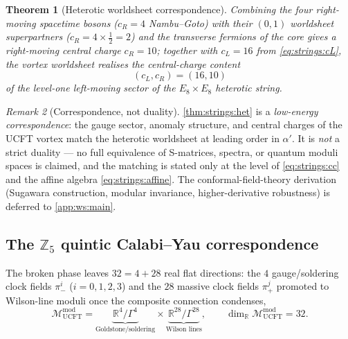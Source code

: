 \documentclass[11pt]{article}
\theoremstyle{plain}
\newtheorem{theorem}{Theorem}[section]
\theoremstyle{definition}
\theoremstyle{remark}
\newtheorem{remark}[theorem]{Remark}
\begin{document}
\begin{theorem}[Heterotic worldsheet correspondence]
\label{thm:strings:het}
Combining the four right-moving spacetime bosons ($c_{R}=4$ Nambu--Goto)
with their $(0,1)$ worldsheet superpartners ($c_{R}=4\times\tfrac12=2$)
and the transverse fermions of the core gives a right-moving central
charge $c_{R}=10$; together with $c_{L}=16$ from \eqref{eq:strings:cL},
the vortex worldsheet realises the central-charge content
\begin{equation}
  (c_{L},c_{R})=(16,10)
  \label{eq:strings:cc}
\end{equation}
of the level-one left-moving sector of the $E_{8}\times E_{8}$ heterotic
string.
\end{theorem}

\begin{remark}[Correspondence, not duality]
\label{rem:strings:corr}
\autoref{thm:strings:het} is a \emph{low-energy correspondence}: the
gauge sector, anomaly structure, and central charges of the UCFT vortex
match the heterotic worldsheet at leading order in $\alpha'$. It is
\emph{not} a strict duality --- no full equivalence of S-matrices,
spectra, or quantum moduli spaces is claimed, and the matching is stated
only at the level of \eqref{eq:strings:cc} and the affine algebra
\eqref{eq:strings:affine}. The conformal-field-theory derivation
(Sugawara construction, modular invariance, higher-derivative
robustness) is deferred to \autoref{app:ws:main}.
\end{remark}

\subsection{The $\mathbb{Z}_{5}$ quintic Calabi--Yau correspondence}
\label{sec:strings:cy}

The broken phase leaves $32 = 4+28$ real flat directions: the $4$
gauge/soldering clock fields $\pi_{-}^{i}$ ($i=0,1,2,3$) and the $28$
massive clock fields $\pi_{+}^{j}$ promoted to Wilson-line moduli once
the composite connection condenses,
\begin{equation}
  \mathcal{M}^{\mathrm{mod}}_{\mathrm{UCFT}}
   = \underbrace{\mathbb{R}^{4}/\Gamma^{4}}_{\text{Goldstone/soldering}}
     \times
     \underbrace{\mathbb{R}^{28}/\Gamma^{28}}_{\text{Wilson lines}},
   \qquad
   \dim_{\mathbb{R}}\mathcal{M}^{\mathrm{mod}}_{\mathrm{UCFT}}=32.
  \label{eq:strings:moduliU}
\end{equation}
\end{document}
